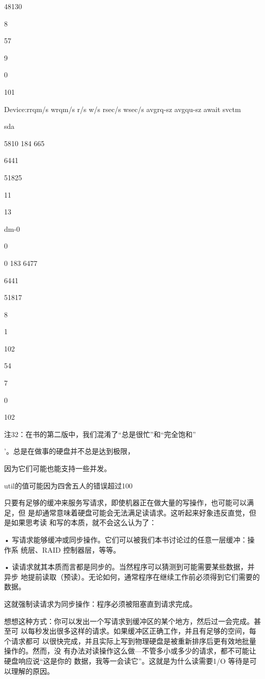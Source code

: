 48130

8

57

9

0

101

Device:rrqm/s wrqm/s r/s w/s rsec/s wsec/s avgrq-sz avgqu-sz await svctm %

sda

5810 184 665

6441

51825

11

13

dm-0

0

0 183 6477

6441

51817

8

1

102

54

7

0

102

注32：在书的第二版中，我们混淆了“总是很忙”和“完全饱和”

’。总是在做事的硬盘并不总是达到极限，

因为它们可能也能支持一些并发。

util的值可能因为四舍五人的错误超过100%

只要有足够的缓冲来服务写请求，即使机器正在做大量的写操作，也可能可以满足，但
是却通常意味着硬盘可能会无法满足读请求。这听起来好象违反直觉，但是如果思考读
和写的本质，就不会这么认为了：

• 写请求能够缓冲或同步操作。它们可以被我们本书讨论过的任意一层缓冲：操作系
统层、RAID 控制器层，等等。

• 读请求就其本质而言都是同步的。当然程序可以猜测到可能需要某些数据，并异步
地提前读取（预读）。无论如何，通常程序在继续工作前必须得到它们需要的数据。

这就强制读请求为同步操作：程序必须被阻塞直到请求完成。

想想这种方式：你可以发出一个写请求到缓冲区的某个地方，然后过一会完成。甚至可
以每秒发出很多这样的请求。如果缓冲区正确工作，并且有足够的空间，每个请求都可
以很快完成，并且实际上写到物理硬盘是被重新排序后更有效地批量操作的。然而，没
有办法对读操作这么做—不管多小或多少的请求，都不可能让硬盘响应说“这是你的
数据，我等一会读它”。这就是为什么读需要1/O 等待是可以理解的原因。

